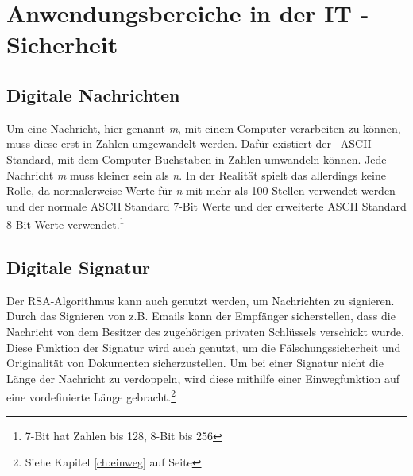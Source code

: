 \documentclass[12pt,a4paper]{scrartcl}
\begin{document}
\pagebreak

\section{Anwendungsbereiche in der IT - Sicherheit}
	\subsection{Digitale Nachrichten}
	\label{chap:digital_text}
Um eine Nachricht, hier genannt \textit{m}, mit einem Computer verarbeiten zu können, muss diese erst in Zahlen umgewandelt werden. Dafür existiert der ~ASCII~ Standard, mit dem Computer Buchstaben in Zahlen umwandeln können. Jede Nachricht \textit{m} muss kleiner sein als \textit{n}. In der Realität spielt das allerdings keine Rolle, da normalerweise Werte für \textit{n} mit mehr als 100 Stellen verwendet werden und der normale ASCII Standard 7-Bit Werte und der erweiterte ASCII Standard 8-Bit Werte verwendet.\footnote{7-Bit hat Zahlen bis 128, 8-Bit bis 256} \cite[S.5]{rowland}
	
	\subsection{Digitale Signatur}
	\label{cha:digital_signature}
	Der RSA-Algorithmus kann auch genutzt werden, um Nachrichten zu signieren. Durch das Signieren von z.B. Emails kann der Empfänger sicherstellen, dass die Nachricht von dem Besitzer des zugehörigen privaten Schlüssels verschickt wurde. Diese Funktion der Signatur wird auch genutzt, um die Fälschungssicherheit und Originalität von  Dokumenten sicherzustellen. Um bei einer Signatur nicht die Länge der Nachricht zu verdoppeln, wird diese mithilfe einer Einwegfunktion auf eine vordefinierte Länge gebracht.\footnote{Siehe Kapitel \ref{ch:einweg} auf Seite \pageref{ch:einweg}}\\
\end{document}
